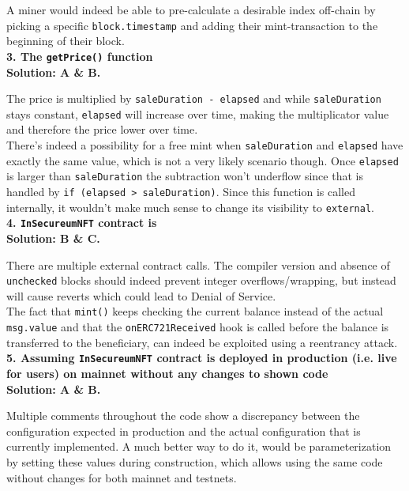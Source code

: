 A miner would indeed be able to pre-calculate a desirable index off-chain by picking a specific \verb|block.timestamp| and adding their mint-transaction to the beginning of their block.\\

\textbf{3. The \texttt{getPrice()} function}\label{sec:exam8_q3}\\

\textbf{Solution: A \& B.}

The price is multiplied by \verb|saleDuration - elapsed| and while \verb|saleDuration| stays constant, \verb|elapsed| will increase over time, making the multiplicator value and therefore the price lower over time.\\

There's indeed a possibility for a free mint when \verb|saleDuration| and \verb|elapsed| have exactly the same value, which is not a very likely scenario though.
Once \verb|elapsed| is larger than \verb|saleDuration| the subtraction won't underflow since that is handled by \verb|if (elapsed > saleDuration)|.
Since this function is called internally, it wouldn't make much sense to change its visibility to \verb|external|.\\

\textbf{4. \texttt{InSecureumNFT} contract is}\label{sec:exam8_q4}\\

\textbf{Solution: B \& C.}

There are multiple external contract calls.
The compiler version and absence of \verb|unchecked| blocks should indeed prevent integer overflows/wrapping, but instead will cause reverts which could lead to Denial of Service.\\

The fact that \verb|mint()| keeps checking the current balance instead of the actual \verb|msg.value| and that the \verb|onERC721Received| hook is called before the balance is transferred to the beneficiary, can indeed be exploited using a reentrancy attack.\\

\textbf{5. Assuming \texttt{InSecureumNFT} contract is deployed in production (i.e. live for users) on mainnet without any changes to shown code}\label{sec:exam8_q5}\\

\textbf{Solution: A \& B.}

Multiple comments throughout the code show a discrepancy between the configuration expected in production and the actual configuration that is currently implemented.
A much better way to do it, would be parameterization by setting these values during construction, which allows using the same code without changes for both mainnet and testnets.\\

